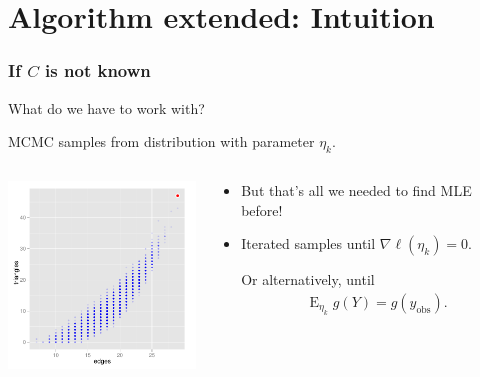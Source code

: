 \documentclass[ 10pt]{beamer}
\DeclareMathOperator{\E}{E}
\newcommand{\etaLCM}{\hat{\eta}_{\textrm{LCM}}}
\newcommand{\yobs}{y_{\text{obs}}}
\begin{document}
\section{Algorithm extended: Intuition}
\frame
{
\frametitle{If $C$ is not known}
What do we have to work with?
\vspace{4mm}

\pause
MCMC samples from distribution with parameter $\eta_k$.  

\vspace{1ex}

\begin{columns}[t]
\begin{column}[T]{0.39\textwidth}
\includegraphics[width=2in]{MCsample-bare}
\end{column}

\begin{column}[r]{0.61\textwidth}
\pause

\begin{itemize}
\item But that's all we needed to find MLE before! 
\vspace{1mm}


\item Iterated samples %
until $\nabla \ell(\eta_k) = 0$.
\vspace{2mm}

Or alternatively, until
\begin{align*}
	\E_{\eta_k} g(Y) = g(\yobs).
\end{align*}

\end{itemize}
\end{column}
\end{columns}
}
\end{document}
